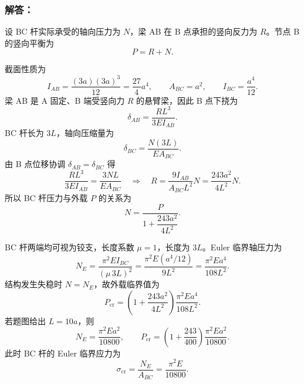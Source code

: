 \documentclass[11pt,a4paper]{ctexrep}
\begin{document}
{\subsubsection*{解答：}

设 BC 杆实际承受的轴向压力为 $N$，梁 AB 在 B 点承担的竖向反力为 $R$。节点 B 的竖向平衡为
\[
    P=R+N.
\]

截面性质为
\[
    I_{AB}=\frac{(3a)(3a)^3}{12}=\frac{27}{4}a^4,\qquad
    A_{BC}=a^2,\qquad
    I_{BC}=\frac{a^4}{12}.
\]
梁 AB 是 A 固定、B 端受竖向力 $R$ 的悬臂梁，因此 B 点下挠为
\[
    \delta_{AB}=\frac{RL^3}{3EI_{AB}}.
\]
BC 杆长为 $3L$，轴向压缩量为
\[
    \delta_{BC}=\frac{N(3L)}{EA_{BC}}.
\]
由 B 点位移协调 $\delta_{AB}=\delta_{BC}$ 得
\[
    \frac{RL^3}{3EI_{AB}}=\frac{3NL}{EA_{BC}}
    \quad\Rightarrow\quad
    R=\frac{9I_{AB}}{A_{BC}L^2}N
    =\frac{243a^2}{4L^2}N.
\]
所以 BC 杆压力与外载 $P$ 的关系为
\[
    N=\frac{P}{1+\dfrac{243a^2}{4L^2}}
    .
\]

BC 杆两端均可视为铰支，长度系数 $\mu=1$，长度为 $3L$。Euler 临界轴压力为
\[
    N_E=\frac{\pi^2 E I_{BC}}{(\mu\,3L)^2}
    =\frac{\pi^2E(a^4/12)}{9L^2}
    =\frac{\pi^2Ea^4}{108L^2}.
\]
结构发生失稳时 $N=N_E$，故外载临界值为
\[
    P_{\text{cr}}
    =\left(1+\frac{243a^2}{4L^2}\right)
      \frac{\pi^2Ea^4}{108L^2}
    .
\]
若题图给出 $L=10a$，则
\[
    N_E=\frac{\pi^2Ea^2}{10800},
    \qquad
    P_{\text{cr}}
    =\left(1+\frac{243}{400}\right)
      \frac{\pi^2Ea^2}{10800}.
\]
此时 BC 杆的 Euler 临界应力为
\[
    \sigma_{\text{cr}}
    =\frac{N_E}{A_{BC}}
    =\frac{\pi^2E}{10800}.
\]


}
\end{document}
